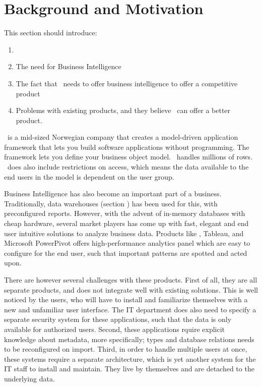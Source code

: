\section{Background and Motivation}
\label{sec:background-and-motivation}
\begin{secex}
    This section should introduce:
    \begin{enumerate}
      \item \genus
      \item The need for Business Intelligence
      \item The fact that \genus~needs to offer business intelligence to offer a competitive product
      \item Problems with existing products, and they believe \genus~can offer a better product.
    \end{enumerate}
\end{secex}

\genus~is a mid-sized Norwegian company that creates a model-driven application framework that lets you build software applications without programming. The framework lets you define your business object model. \genusSoftware~handles millions of rows. \genusSoftware~does also include restrictions on access, which means the data available to the end users in the model is dependent on the user group. 

Business Intelligence has also become an important part of a business. Traditionally, data warehouses (section ) has been used for this, with preconfigured reports. However, with the advent of in-memory databases with cheap hardware, several market players has come up with fast, elegant and end user intuitive solutions to analyze business data. Products like \qlikview, Tableau, and Microsoft PowerPivot offers high-performance analytics panel which are easy to configure for the end user, such that important patterns are spotted and acted upon. 

There are however several challenges with these products. First of all, they are all separate products, and does not integrate well with existing solutions. This is well noticed by the users, who will have to install and familiarize themselves with a new and unfamiliar user interface. The IT department does also need to specify a separate security system for these applications, such that the data is only available for authorized users. Second, these applications rquire explicit knowledge about metadata, more specifically; types and database relations needs to be reconfigured on import. Third, in order to handle multiple users at once, these systems require a separate architecture, which is yet another system for the IT staff to install and maintain. They live by themselves and are detached to the underlying data.


